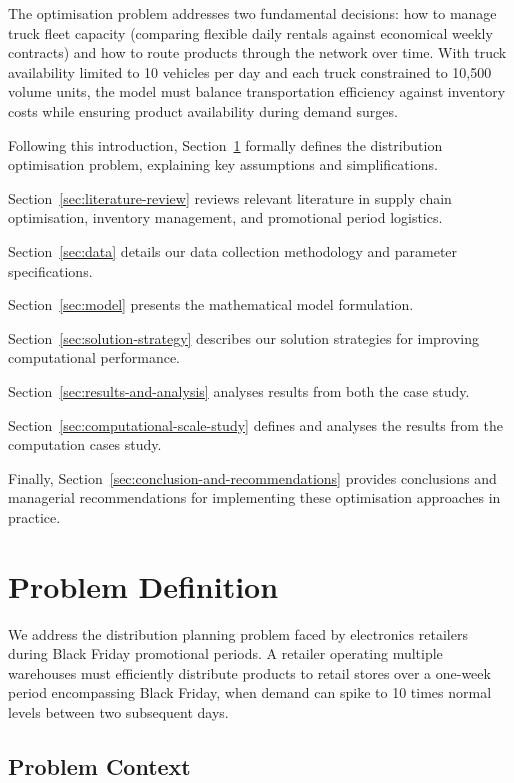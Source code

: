 \documentclass[a4paper,12pt]{article}
\begin{document}
The optimisation problem addresses two fundamental decisions: how to manage truck fleet capacity (comparing flexible daily rentals against economical weekly contracts) and how to route products through the network over time.
With truck availability limited to 10 vehicles per day and each truck constrained to 10,500 volume units, the model must balance transportation efficiency against inventory costs while ensuring product availability during demand surges.

Following this introduction, Section~\ref{sec:problem-definition} formally defines the distribution optimisation problem, explaining key assumptions and simplifications.

Section~\ref{sec:literature-review} reviews relevant literature in supply chain optimisation, inventory management, and promotional period logistics.

Section~\ref{sec:data} details our data collection methodology and parameter specifications.

Section~\ref{sec:model} presents the mathematical model formulation.

Section~\ref{sec:solution-strategy} describes our solution strategies for improving computational performance.

Section~\ref{sec:results-and-analysis} analyses results from both the case study.

Section~\ref{sec:computational-scale-study} defines and analyses the results from the computation cases study.

Finally, Section~\ref{sec:conclusion-and-recommendations} provides conclusions and managerial recommendations for implementing these optimisation approaches in practice.





\section{Problem Definition}\label{sec:problem-definition}

We address the distribution planning problem faced by electronics retailers during Black Friday promotional periods.
A retailer operating multiple warehouses must efficiently distribute products to retail stores over a one-week period encompassing Black Friday, when demand can spike to 10 times normal levels between two subsequent days.

\subsection{Problem Context}\label{subsec:problem-context}
\end{document}
